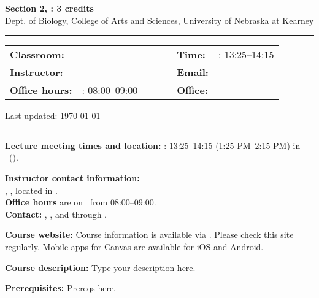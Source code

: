 \documentclass[11pt]{article}
\begin{document}
	\begin{center}
		{\Large \textsc{\textbf{\coursenamelong}}}
	\end{center}
	\begin{center}
		\textbf{Section 2, \semester: 3 credits} \\
		Dept. of Biology, College of Arts and Sciences, University of Nebraska at Kearney
	\end{center}
	
	\begin{center}
		\rule{6in}{0.4pt}
		\begin{minipage}[t]{0.95\textwidth}
			\begin{tabular}{llcccll}
				\textbf{Classroom:} & \classroom & & & & \textbf{Time:} & \classdays: 13:25--14:15 \\
				\textbf{Instructor:} & \profname & & & & \textbf{Email:} & \email \\
				\textbf{Office hours:} & \classdays: 08:00--09:00 & & & & \textbf{Office:} & \office \\
			\end{tabular}
			\centering
			Last updated: \today
		\end{minipage}
		\rule{6in}{0.4pt}
	\end{center}
	\vspace{.3cm}
	\setlength{\unitlength}{1in}
	\renewcommand{\arraystretch}{2}
	
	\noindent\textbf{Lecture meeting times and location:} \longdays: 13:25--14:15 (1:25 PM--2:15 PM) in \classroom\ (\buildingname).
	
	\skippers
	\noindent\textbf{Instructor contact information:}\\
	\textbf{\profname}, \proftitle, located in \office.\\ \textbf{Office hours} are on \classdays\ from 08:00--09:00. \\
	\noindent\textbf{Contact:} \phone, \email, and through \canvas.
	
	\skippers
	\noindent\textbf{Course website:} Course information is available via 
	\canvas. Please check this site regularly. Mobile apps for Canvas are available for iOS and Android.
	
	\skippers
	\noindent\textbf{Course description:} Type your description here.
	
	\skippers
	\noindent\textbf{Prerequisites:} Prereqs here.
	 
\end{document}
